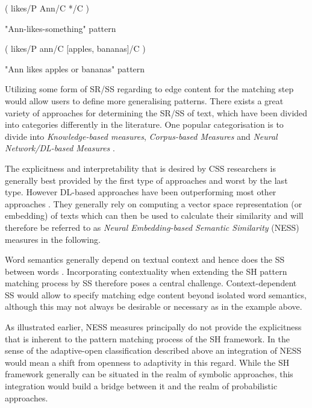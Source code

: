 \documentclass[11pt]{scrreprt}
\let\cite\parencite  %
\begin{document}
\begin{pattern}[h!]
  \normalfont\sffamily
  \centering
  ( likes/P Ann/C */C )
  \caption{"Ann-likes-something" pattern}
  \label{pat:ann-likes-something}
\end{pattern}

\begin{pattern}[h!]
  \normalfont\sffamily
  \centering
  ( likes/P ann/C [apples, bananas]/C )
  \caption{"Ann likes apples or bananas" pattern}
  \label{pat:ann-likes-apples-and-bananas}
\end{pattern}



Utilizing some form of SR/SS regarding to edge content for the matching step would allow users to define more generalising patterns. There exists a great variety of approaches for determining the SR/SS of text, which have been divided into categories differently in the literature. One popular categorisation is to divide into \textit{Knowledge-based measures}, \textit{Corpus-based Measures} and \textit{Neural Network/DL-based Measures} \cite[Section~1.3.2]{harispeSemanticSimilarityNatural2015} \cite{chandrasekaranEvolutionSemanticSimilarity2021} \cite{hanSurveyTechniquesApplications2021}. 

The explicitness and interpretability that is desired by CSS researchers is generally best provided by the first type of approaches and worst by the last type. However DL-based approaches have been outperforming most other approaches \cite{chandrasekaranEvolutionSemanticSimilarity2021}. They generally rely on computing a vector space representation (or embedding) of texts which can then be used to calculate their similarity and will therefore be referred to as \textit{Neural Embedding-based Semantic Similarity} (NESS) measures in the following. 

Word semantics generally depend on textual context and hence does the SS between words \cite[Section~2.2.3]{harispeSemanticSimilarityNatural2015}. Incorporating contextuality when extending the SH pattern matching process by SS therefore poses a central challenge. Context-dependent SS would allow to specify matching edge content beyond isolated word semantics, although this may not always be desirable or necessary as in the example above. 

As illustrated earlier, NESS measures principally do not provide the explicitness that is inherent to the pattern matching process of the SH framework. In the sense of the adaptive-open classification described above an integration of NESS would mean a shift from openness to adaptivity in this regard. While the SH framework generally can be situated in the realm of symbolic approaches, this integration would build a bridge between it and the realm of probabilistic approaches.
\end{document}

